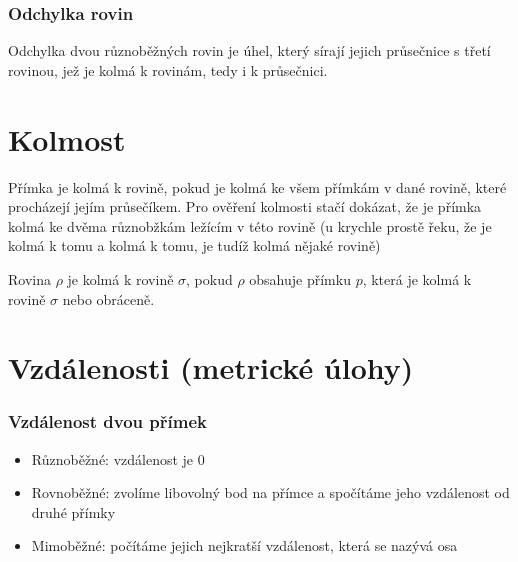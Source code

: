 \documentclass[12pt]{article}
\begin{document}
\subsubsection*{Odchylka rovin}
Odchylka dvou různoběžných rovin je úhel, který sírají jejich průsečnice s třetí rovinou, jež je kolmá k rovinám, tedy i k průsečnici.

\section*{Kolmost}
Přímka je kolmá k rovině, pokud je kolmá ke všem přímkám v dané rovině, které procházejí jejím průsečíkem. Pro ověření kolmosti stačí dokázat, že je přímka kolmá ke dvěma různobžkám ležícím v této rovině (u krychle prostě řeku, že je kolmá k tomu a kolmá k tomu, je tudíž kolmá  nějaké rovině)

Rovina $\rho$ je kolmá k rovině $\sigma$, pokud $\rho$ obsahuje přímku $p$, která je kolmá k rovině $\sigma$ nebo obráceně.

\section*{Vzdálenosti (metrické úlohy)}
\subsubsection*{Vzdálenost dvou přímek}
\begin{itemize}
    \item Různoběžné: vzdálenost je 0
    \item Rovnoběžné: zvolíme libovolný bod na přímce a spočítáme jeho vzdálenost od druhé přímky
    \item Mimoběžné: počítáme jejich nejkratší vzdálenost, která se nazývá osa
\end{itemize}
\end{document}
